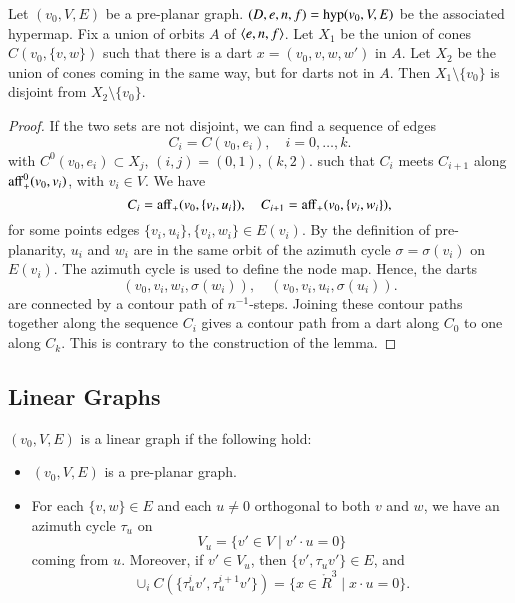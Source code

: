 %

\begin{lemma}  
Let $(v_0,V,E)$ be a pre-planar graph.  
$(D,e,n,f) = {\operatorname{hyp}}(v_0,V,E)$ be the associated hypermap.
Fix a union of orbits $A$ 
of $\langle e,n,f\rangle$.  Let $X_1$ be
the union of cones $C(v_0,{\{v,w\}})$ such that there is a dart 
$x =
(v_0,v,w,w')$ in $A$.  Let $X_2$ be the union of cones coming in the
same way, but for darts not in $A$.  Then $X_1\setminus\{v_0\}$ is disjoint
from $X_2\setminus\{v_0\}$.
\end{lemma}

\begin{proof} 
If the two sets are not disjoint, we can find a sequence of
edges
   $$C_i=C(v_0,e_i),\quad i=0,\ldots,k.$$
with $C^0(v_0,e_i)\subset X_j$, $(i,j)=(0,1),(k,2)$.
such that $C_i$ meets $C_{i+1}$ along ${\operatorname{aff}}_+^0(v_0,v_i)$,
with $v_i\in V$.   We have
$$C_i = {\operatorname{aff}}_+(v_0,\{v_i,u_i\}),
  \quad 
  C_{i+1} = {\operatorname{aff}}_+(v_0,\{v_i,w_i\}),$$
for some points edges $\{v_i,u_i\},\{v_i,w_i\}\in E(v_i)$.
By the definition of pre-planarity, $u_i$ and $w_i$ are
in the same orbit of the azimuth cycle $\sigma=\sigma(v_i)$ on $E(v_i)$.
The azimuth cycle is used to define the node map.
Hence, the darts 
   $$
   (v_0,v_i,w_i,\sigma(w_i)),\quad
   (v_0,v_i,u_i,\sigma(u_i)).
   $$
are connected by a contour path of $n^{-1}$-steps.
Joining these contour paths together along the sequence
$C_i$ gives a contour path from a dart along $C_0$ to
one along $C_k$.  This is contrary to the construction of
the lemma.
\end{proof}



\subsection{Linear Graphs}


\begin{definition}
  $(v_0,V,E)$ is a linear graph if the following hold:
  \begin{itemize}
  \item $(v_0,V,E)$ is a pre-planar graph.
  \item For each $\{v,w\}\in E$ and each $u\ne0$ orthogonal to both
  $v$ and $w$, we have an azimuth cycle $\tau_u$ on
    $$V_u = \{ v' \in V \mid v'\cdot u = 0\}$$
    coming from $u$.  Moreover, if $v'\in V_u$, then $\{v',\tau_u
    v'\}\in E$, and
    $$\cup_{i} C({\{\tau_u^i v',\tau_u^{i+1} v'\}}) = \{x \in \ring{R}^3\mid
    x\cdot u = 0\}.$$
  \end{itemize}
\end{definition}

